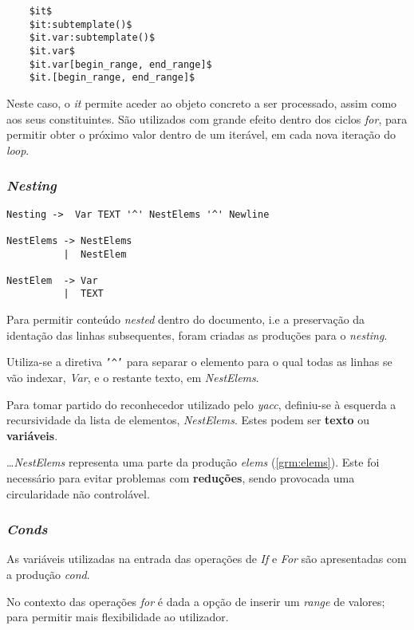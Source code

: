\documentclass[../relatorio.tex]{subfiles}
\begin{document}
\begin{verbatim}
    $it$
    $it:subtemplate()$
    $it.var:subtemplate()$
    $it.var$
    $it.var[begin_range, end_range]$
    $it.[begin_range, end_range]$
\end{verbatim}

Neste caso, o \textit{it} permite aceder ao objeto concreto a ser processado,
assim como aos seus constituintes.
São utilizados com grande efeito dentro dos ciclos \textit{for}, 
para permitir obter o próximo valor dentro de um 
iterável, em cada nova iteração do \textit{loop}.


\subsubsection{\textit{Nesting}} \label{grm:nest}
\begin{verbatim}
Nesting ->  Var TEXT '^' NestElems '^' Newline

NestElems -> NestElems
          |  NestElem

NestElem  -> Var
          |  TEXT
\end{verbatim}
Para permitir conteúdo \textit{nested} dentro do documento, i.e
a preservação da identação das linhas subsequentes, 
foram criadas as produções para o \textit{nesting}.

Utiliza-se a diretiva \texttt{'^'} para separar o elemento para o qual todas as 
linhas se vão indexar, \textit{Var}, e o restante texto, em \textit{NestElems}.

Para tomar partido do reconhecedor utilizado pelo \textit{yacc}, 
definiu-se à esquerda a recursividade da lista de elementos, \textit{NestElems}.
Estes podem ser \textbf{texto} ou \textbf{variáveis}.

\dots \textit{NestElems} representa uma parte da produção 
\textit{elems} (\ref{grm:elems}). Este foi necessário para evitar problemas 
com \textbf{reduções}, sendo provocada uma circularidade não controlável.

\subsubsection{\textit{Conds}} \label{grm:conds}
As variáveis utilizadas na entrada das operações de \textit{If} e
\textit{For} são apresentadas com a produção \textit{cond}.

No contexto das operações \textit{for} é dada a opção 
de inserir um \textit{range} de valores; para permitir
mais flexibilidade ao utilizador.
\end{document}
